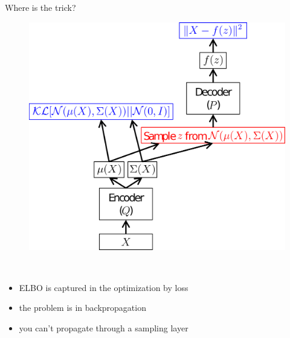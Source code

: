 \documentclass[10pt]{beamer}
\begin{document}
\begin{frame}{Where is the trick?}
    \begin{minipage}[c]{0.3\textwidth}
            \begin{figure}
                \includegraphics[width=\textwidth]{figs/net.png}
            \end{figure}
    \end{minipage}
    ~
    \begin{minipage}[c]{0.6\textwidth}
        \begin{itemize}[<+(1)->]
            \item ELBO is captured in the optimization by loss
            \item the problem is in backpropagation
            \item you can't propagate through a sampling layer
        \end{itemize}
    \end{minipage}
    
\end{frame}
\end{document}
